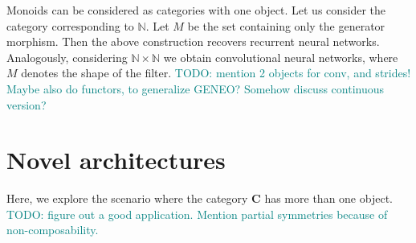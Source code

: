 \documentclass[12pt]{article}
\newcommand{\pietro}[1]{\textcolor{teal}{#1}}
\newcommand{\Cat}{{\mathbf{C}}}
\begin{document}
Monoids can be considered as categories with one object. Let us consider the category corresponding to $\mathbb N$. Let $M$ be the set containing only the generator morphism. Then the above construction recovers recurrent neural networks. Analogously, considering $\mathbb N \times \mathbb N$ we obtain convolutional neural networks, where $M$ denotes the shape of the filter.
\pietro{TODO: mention 2 objects for conv, and strides!}
\pietro{Maybe also do functors, to generalize GENEO? Somehow discuss continuous version?}

\section{Novel architectures}

Here, we explore the scenario where the category $\Cat$ has more than one object.
\pietro{TODO: figure out a good application.}
\pietro{Mention partial symmetries because of non-composability.}



\end{document}
